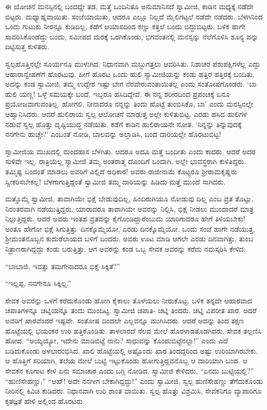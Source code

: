 ಈ ಯೋಚನೆ ಮನಸ್ಸಿನಲ್ಲಿ ಬಂದದ್ದೇ ತಡ, ಮತ್ತೆ ಒಂದಿನಿತೂ ಅನುಮಾನಿಸದೆ ಸ್ವಾಮೀಜಿ, ಕಾಡಿನ ಮಧ್ಯಕ್ಕೆ ನಡೆದೇ ಬಿಟ್ಟರು. ಮಧ್ಯಾಹ್ನವಾಯಿತು. ಸಂಜೆಯಾಯಿತು, ಆದರೂ ಎಲ್ಲೂ ನಿಲ್ಲದೆ ಮೈಲಿಗಟ್ಟಲೆ ನಡೆದೇ ನಡೆದರು. ಬೆಳಗಿನಿಂದ ಒಂದು ಗುಟುಕು ನೀರನ್ನೂ ಕುಡಿದಿಲ್ಲ. ಕಡೆಗೆ ಆಯಾಸದಿಂದ ಕಣ್ಣು ಕತ್ತಲೆ ಬಂದು ಬಿದ್ದುಬಿಟ್ಟರು. ಬಳಿಕ ಹಾಗೇ ಸಾವರಿಸಿಕೊಂಡೆದ್ದು ಬಂದು, ಸಮೀಪದ ಮರಕ್ಕೆ ಒರಗಿಕೊಂಡು, ಭಗವಂತನಲ್ಲಿ ಮನಸ್ಸನ್ನು ನೆಲೆಗೊಳಿಸಿ ಶೂನ್ಯ ವನ್ನು ದಿಟ್ಟಿಸುತ್ತ ಕುಳಿತರು.

ಸ್ವಲ್ಪಹೊತ್ತಿನಲ್ಲೇ ಸೂರ್ಯನೂ ಮುಳುಗಿದ. ನಿಧಾನವಾಗಿ ಮಬ್ಬುಗತ್ತಲು ಆವರಿಸಿತು. ನಿಶಾಚರ ಪಶುಪಕ್ಷಿಗಳೆಲ್ಲ ಎದ್ದು ಆಹಾರಾನ್ವೇಷಣೆಗೆ ಹೊರಟುವು. ಹೀಗೆ ಹೊರಟ ಒಂದು ಹುಲಿ ಸ್ವಾಮೀಜಿಯನ್ನು ಕಂಡು ಹತ್ತಿರ ಹತ್ತಿರಕ್ಕೆ ಬಂದಿತು. ಅದನ್ನು ಕಂಡ ಸ್ವಾಮೀಜಿ, ತಮ್ಮ ಉದ್ದೇಶ ಇಷ್ಟು ಬೇಗ ನೆರವೇರುವಂತಾಯಿತಲ್ಲ ಎಂದು ಸಂತೋಷಗೊಂಡರು. ‘ಬಾ ಹುಲಿ ಯಣ್ಣ! ಒಳ್ಳೆ ಸಮಯಕ್ಕೇ ಬಂದೆ. ಇಬ್ಬರೂ ಹಸಿದಿದ್ದೇವೆ. ಈ ನನ್ನ ಶರೀರದಿಂದ ಪ್ರಪಂಚಕ್ಕೆ ಏನೂ ಪ್ರಯೋಜವಾಗುವಂತಿಲ್ಲ. ಹೋಗಲಿ, ನೀನಾದರೂ ನನ್ನನ್ನು ತಿಂದು ಹೊಟ್ಟೆ ತುಂಬಿಸಿಕೊ, ಬಾ’ ಎಂದು ಮನಸ್ಸಿನಲ್ಲೇ ಆಹ್ವಾನಿಸಿದರು. ಆದರೆ ಹುಲಿರಾಯ ಸ್ವಲ್ಪ ಆಲೋಚನೆ ಮಾಡುತ್ತ ಅಲ್ಲೇ ಕುಳಿತುಬಿಟ್ಟ. ಎರಡು ಹಸಿದ ಹುಲಿಗಳ ನಡುವೆ ಸ್ವಲ್ಪ ಹೊತ್ತು ದೃಷ್ಟಿಯುದ್ಧ ನಡೆಯಿತು. ಕಡೆಗೆ ಕಾಡಿನ ಹುಲಿರಾಯನೇ ಸೋತ. ‘ನಿನ್ನನ್ನು ತಿನ್ನುವುದಕ್ಕೆ ನನಗೇನು ಹುಚ್ಚೇ?’ ಎಂಬಂತೆ ನೋಡಿ, ಬಾಲವನ್ನು ಅಲ್ಲಾಡಿಸಿ, ಬಂದ ದಾರಿಯಲ್ಲೇ ಹೊರಟುಬಿಟ್ಟ!

ಸ್ವಾಮೀಜಿಯ ಮುಖದಲ್ಲಿ ಮಂದಹಾಸ ಬೆಳಗಿತು. ಆದರೂ ಅದೂ ಮತ್ತೆ ಬಂದೀತು ಎಂದು ಕಾದರು. ಆದರೆ ಅದರ ಸುಳಿವೇ ಇಲ್ಲ. ರಾತ್ರಿಯೆಲ್ಲ ಸ್ವಾಮೀಜಿ ತಮ್ಮ ಅಂತರಾತ್ಮ ದೊಂದಿಗೆ ಒಂದಾಗಿ, ಅಲ್ಲೇ ಭಾವಸ್ಥರಾಗಿ ಕುಳಿತಿದ್ದರು. ತಮ್ಮಿಷ್ಟ ಬಂದಂತೆ ಮಾಡಲು ಅವರಿಗೆ ಎಲ್ಲಿದೆ ಅಧಿಕಾರ! ಅವರು ರಾಜೀನಾಮೆ ಕೊಟ್ಟರೂ ಶ್ರೀರಾಮಕೃಷ್ಣರು ಸ್ವೀಕರಿಸಬೇಕಲ್ಲ! ಬೆಳಗಾಗುತ್ತಿದ್ದಂತೆ ಸ್ವಾಮೀಜಿ ತಮ್ಮ ದಾರಿಯನ್ನು ಹಿಡಿದು ಮತ್ತೆ ಮುಂದೆ ಸಾಗಿದರು.

ಮತ್ತೊಮ್ಮೆ ಸ್ವಾಮೀಜಿ, ತಾವಾಗಿಯೇ ಭಿಕ್ಷೆ ಬೇಡುವುದಿಲ್ಲ, ಹಿಂದಿರುಗಿಯೂ ನೋಡುವು ದಿಲ್ಲ ಎಂಬ ವ್ರತ ತೊಟ್ಟು, ನಿರಂತರವಾಗಿ ನಡೆಯುತ್ತಿದ್ದರು. ಯಾರಾದರೂ ತಾವಾಗಿಯೇ ಅವರನ್ನು ನಿಲ್ಲಿಸಿ, ಭಿಕ್ಷೆ ನೀಡಲು ಮುಂದಾದರೆ ಮಾತ್ರ ನಿಲ್ಲುತ್ತಿದ್ದರು. ಆದರೆ ಅವರು ಇಂತಹ ವ್ರತವನ್ನು ಕೈಗೊಂಡಿದ್ದಾರೆಂಬುದು ಯಾರಿಗಾದರೂ ಹೇಗೆ ತಿಳಿಯಬೇಕು! ಅಂತೂ ಹೇಗೋ ಭಿಕ್ಷೆ ಸಿಗುತ್ತಿತ್ತು–ದಿನಕ್ಕೊಮ್ಮೆಯೋ, ಎರಡು ದಿನಕ್ಕೊಮ್ಮೆಯೋ. ಒಂದು ಸಂಜೆ ಹಾಗೇ ನಡೆಯುತ್ತ, ಶ್ರೀಮಂತನೊಬ್ಬನ ಕುದುರೆಲಾಯದ ಬಳಿಗೆ ಬಂದರು. ಅವರು ಊಟ ಮಾಡಿ ಆಗಲೇ ಎರಡು ದಿನವಾಗಿತ್ತು. ತುಂಬ ನಿತ್ರಾಣರಾಗಿದ್ದದ್ದು ಕಂಡು ಬರುತ್ತಿತ್ತು. ಆಗ ಅವರನ್ನು ಕಂಡ ಒಬ್ಬ ಸೇವಕ ಅವರನ್ನು ಕರೆದು ನಮಸ್ಕರಿಸಿ ಕೇಳಿದ:

“ಬಾಬಾಜಿ, ಇವತ್ತು ತಮಗೇನಾದರೂ ಭಿಕ್ಷೆ ಸಿಕ್ಕಿತೆ?”

“ಇಲ್ಲಪ್ಪ, ನನಗೇನೂ ಸಿಕ್ಕಿಲ್ಲ.”

ಸೇವಕ ಅವರನ್ನು ಒಳಗೆ ಕರೆದುಕೊಂಡು ಹೋಗಿ ಕೈಕಾಲು ತೊಳೆಯಲು ನೀರುಕೊಟ್ಟ. ಬಳಿಕ ತನ್ನದೇ ಆಹಾರವಾದ ಚಪಾತಿಗಳನ್ನೂ ಚಟ್ನಿಯನ್ನೂ ತಂದು ಮುಂದಿಟ್ಟ. ಸ್ವಾಮೀಜಿ ಚಪಾತಿ- ಚಟ್ನಿ ತಿಂದರು. ಚಟ್ನಿ ವಿಪರೀತ ಖಾರ. ಆದರೆ ಅವರಿಗೆ ಖಾರವೆಂದರೆ ಇಷ್ಟವೇ. ಸಂತೋಷ ದಿಂದಲೇ ಎಲ್ಲವನ್ನೂ ಮುಗಿಸಿದರು. ಆದರೆ ಅದನ್ನು ತಿಂದ ತಕ್ಷಣ ಹೊಟ್ಟೆಯಲ್ಲಿ ಭಯಂಕರ ಉರಿ ಹತ್ತಿಕೊಂಡಿತು. ತಾಳಲಾರದೆ ನೆಲದ ಮೇಲೆ ಹೊರಳಾಡತೊಡಗಿದರು. ಸೇವಕ ತಲ್ಲಣಿಸಿ ಹೋದ. “ಅಯ್ಯಯ್ಯೋ, ಇದೇನು ಮಾಡಿಬಿಟ್ಟೆ ನಾನು? ಸಾಧುವನ್ನು ಕೊಂದುಬಿಟ್ಟೆನಲ್ಲಾ!” ಎಂದು ಎದೆ ಬಡಿದುಕೊಂಡು ಅಳಲಾರಂಭಿಸಿದ. ಖಾಲಿ ಹೊಟ್ಟೆಯಲ್ಲಿ ಅಷ್ಟೊಂದು ಖಾರ ತಿಂದದ್ದರಿಂದ ಅಷ್ಟು ಉರಿಯಾಗಿರಬೇಕು. ಆ ಹೊತ್ತಿಗೆ ಸರಿಯಾಗಿ, ತಲೆಯ ಮೇಲೆ ಬುಟ್ಟಿ ಇಟ್ಟುಕೊಂಡು ಹೋಗುತ್ತಿದ್ದವನೊಬ್ಬ ಆ ದಾರಿಯಾಗಿ ಬಂದ. ಆ ಸೇವಕನ ಕೂಗಾಟ ಕೇಳಿ ಏನು ಸಮಾಚಾರ ಎಂದು ಬಗ್ಗಿ ನೋಡಿದ. ಸ್ವಾಮೀಜಿ ಕೇಳಿದರು, “ಏನದು ಬುಟ್ಟಿಯಲ್ಲಿ?” “ಹುಣಿಸೇಹಣ್ಣು,” “ಆಹ್! ಅದೇ ನನಗೀಗ ಬೇಕಾಗಿದ್ದದ್ದು!” ಎಂದು ಸ್ವಾಮೀಜಿ, ಸ್ವಲ್ಪ ಹುಣಿಸೇಹಣ್ಣು ತೆಗೆದುಕೊಂಡು ನೀರಿನಲ್ಲಿ ಕಿವಿಚಿ ಕುಡಿದರು. ನಿಧಾನವಾಗಿ ಉರಿ ಶಾಂತ ವಾಯಿತು. ಸ್ವಲ್ಪ ಹೊತ್ತು ವಿಶ್ರಮಿಸಿ, ಸೇವಕನಿಗೂ ವ್ಯಾಪಾರಿಗೂ ಕೃತಜ್ಞತೆ ಹೇಳಿ ಅಲ್ಲಿಂದ ಹೊರಟರು.

